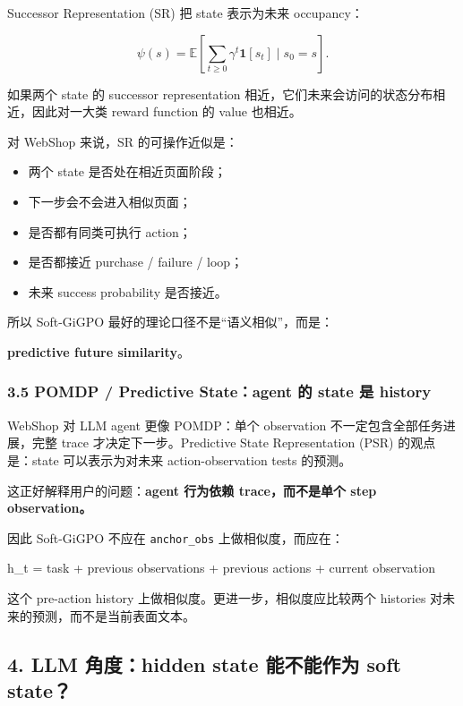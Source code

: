 \documentclass[
  10pt,
]{ctexart}
\newenvironment{Shaded}{}{}
\newcommand{\NormalTok}[1]{#1}
\providecommand{\tightlist}{%
  \setlength{\itemsep}{0pt}\setlength{\parskip}{0pt}}
\begin{document}
Successor Representation (SR) 把 state 表示为未来 occupancy：

\[
\psi(s)=\mathbb{E}\left[\sum_{t\ge0}\gamma^t \mathbf{1}[s_t]\mid s_0=s\right].
\]

如果两个 state 的 successor representation
相近，它们未来会访问的状态分布相近，因此对一大类 reward function 的
value 也相近。

对 WebShop 来说，SR 的可操作近似是：

\begin{itemize}
\tightlist
\item
  两个 state 是否处在相近页面阶段；
\item
  下一步会不会进入相似页面；
\item
  是否都有同类可执行 action；
\item
  是否都接近 purchase / failure / loop；
\item
  未来 success probability 是否接近。
\end{itemize}

所以 Soft-GiGPO 最好的理论口径不是``语义相似''，而是：

\textbf{predictive future similarity}。

\subsubsection{3.5 POMDP / Predictive State：agent 的 state 是
history}\label{pomdp-predictive-stateagent-ux7684-state-ux662f-history}

WebShop 对 LLM agent 更像 POMDP：单个 observation
不一定包含全部任务进展，完整 trace 才决定下一步。Predictive State
Representation (PSR) 的观点是：state 可以表示为对未来 action-observation
tests 的预测。

这正好解释用户的问题：\textbf{agent 行为依赖 trace，而不是单个 step
observation。}

因此 Soft-GiGPO 不应在 \texttt{anchor\_obs} 上做相似度，而应在：

\begin{Shaded}
\begin{Highlighting}[]
\NormalTok{h\_t = task + previous observations + previous actions + current observation}
\end{Highlighting}
\end{Shaded}

这个 pre-action history 上做相似度。更进一步，相似度应比较两个 histories
对未来的预测，而不是当前表面文本。

\subsection{4. LLM 角度：hidden state 能不能作为 soft
state？}\label{llm-ux89d2ux5ea6hidden-state-ux80fdux4e0dux80fdux4f5cux4e3a-soft-state}
\end{document}
